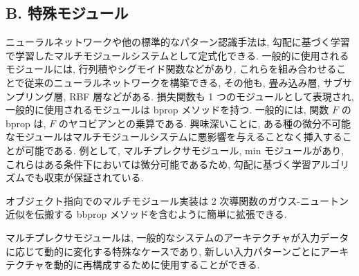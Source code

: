 \documentclass[twocolumn]{jarticle}     %
\begin{document}
\subsection*{B. 特殊モジュール}
ニューラルネットワークや他の標準的なパターン認識手法は, 勾配に基づく学習で学習したマルチモジュールシステムとして定式化できる.
一般的に使用されるモジュールには, 行列積やシグモイド関数などがあり, これらを組み合わせることで従来のニューラルネットワークを構築できる, その他も, 畳み込み層, サブサンプリング層, RBF 層などがある. 損失関数も 1 つのモジュールとして表現され, 一般的に使用されるモジュールは bprop メソッドを持つ. 一般的には, 関数 $F$ の bprop は, $F$ のヤコビアンとの乗算である.
 興味深いことに, ある種の微分不可能なモジュールはマルチモジュールシステムに悪影響を与えることなく挿入することが可能である.
 例として, マルチプレクサモジュール, min モジュールがあり, これらはある条件下においては微分可能であるため, 勾配に基づく学習アルゴリズムでも収束が保証されている.
\par
オブジェクト指向でのマルチモジュール実装は 2 次導関数のガウス-ニュートン近似を伝搬する bbprop メソッドを含むように簡単に拡張できる.
\par
マルチプレクサモジュールは, 一般的なシステムのアーキテクチャが入力データに応じて動的に変化する特殊なケースであり, 新しい入力パターンごとにアーキテクチャを動的に再構成するために使用することができる.
\end{document}
